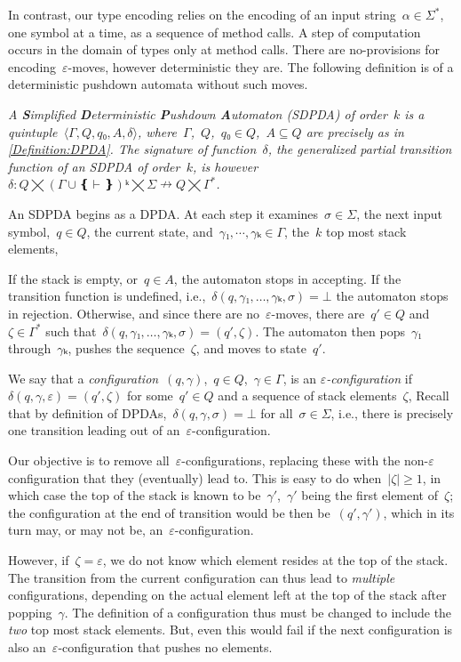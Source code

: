 In contrast, our type encoding relies on the encoding of an input string~$α∈Σ^*$, one symbol at a time, as a sequence of method calls.
A step of computation occurs in the domain of \Java types only at method calls. There are no-provisions for encoding~$ε$-moves, however deterministic
  they are.
The following definition is of a deterministic pushdown automata without such moves.

\begin{Definition}
  \label{Definition:SDPDA}
  \slshape
  A \emph{\textbf Simplified \textbf Deterministic \textbf Pushdown \textbf Automaton} (SDPDA) of order~$k$ is
    a quintuple~$⟨Γ,Q,q₀,A,δ⟩$,
  where~$Γ$,~$Q$,~$q₀∈Q$,~$A⊆Q$ are precisely as in \cref{Definition:DPDA}.
  The signature of function~$δ$, the \emph{generalized partial transition function}
  of an SDPDA of order~$k$, is however~$δ: Q⨉\left(Γ∪❴\vdash❵\right)ᵏ⨉Σ↛Q⨉Γ^*$.
  \par
  An SDPDA begins as a DPDA\@. At each step it examines~$σ∈Σ$,
    the next input symbol,~$q∈Q$, the current state,
    and~$γ₁,⋯,γₖ∈Γ$, the~$k$ top most stack elements,
  \par
  If the stack is empty, or~$q∈A$, the automaton stops in accepting.
  If the transition function is undefined, i.e.,~$δ(q,γ₁,…,γₖ,σ)=⊥$ the automaton
    stops in rejection.
  Otherwise, and since there are no~$ε$-moves, there are~$q'∈Q$ and~$ζ∈Γ^*$
    such that~$δ(q,γ₁,…,γₖ,σ)=(q',ζ)$.
  The automaton then pops~$γ₁$ through~$γₖ$, pushes the sequence~$ζ$, and
    moves to state~$q'$.
\end{Definition}

We say that
a \emph{configuration}~$(q,γ)$,~$q∈Q$,~$γ∈Γ$,
  is an \emph{$ε$-configuration} if~$δ(q,γ,ε)=(q',ζ)$ for
    some~$q'∈Q$ and a sequence of stack elements~$ζ$,
Recall that by definition of DPDAs,~$δ(q,γ,σ)=⊥$ for
  all~$σ∈Σ$, i.e., there is precisely one transition
  leading out of an~$ε$-configuration.

Our objective is to remove all~$ε$-configurations,
  replacing these with the non-$ε$ configuration that
  they (eventually) lead to.
This is easy to do when~$|ζ|≥1$, in which
  case the top of the stack is known to be~$γ'$,~$γ'$ being the first
    element of~$ζ$; the configuration at the end of transition
    would be then be~$(q',γ')$, which in its turn may, or may not be,
    an~$ε$-configuration.

However, if~$ζ=ε$, we do not know which element resides at the top
  of the stack.
The transition from the current configuration can thus lead to \emph{multiple} configurations,
  depending on the actual element left at the top of the stack after popping~$γ$.
The definition of a configuration thus must be changed to include the \emph{two} top
  most stack elements.
But, even this would fail if the next configuration is also an~$ε$-configuration that pushes no elements.

